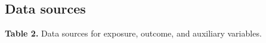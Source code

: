 \documentclass[11pt]{article}
\begin{document}
\clearpage
\begin{landscape}
\thispagestyle{empty}
\begingroup
\newsavebox{\datasourcespagebox}
\begin{lrbox}{\datasourcespagebox}
\begin{minipage}{\linewidth}
\subsection*{Data sources}

\vspace{0.7cm}

\noindent
{\footnotesize {}\label{tab2}\textbf{Table 2.} Data sources for exposure, outcome, and auxiliary variables.\par}
\vspace{4pt}


\end{minipage}
\end{lrbox}
\end{landscape}
\end{document}
